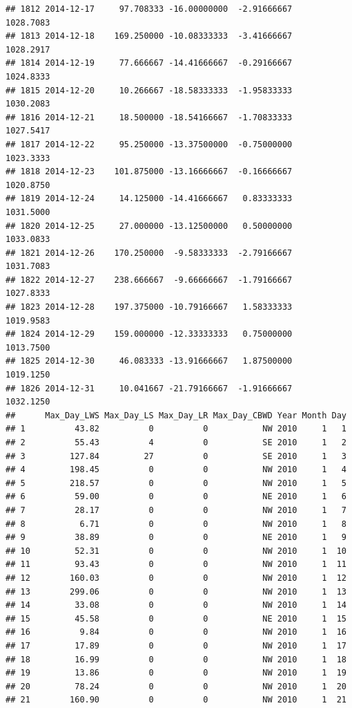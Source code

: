 \documentclass[
]{article}
\begin{document}
\begin{verbatim}
## 1812 2014-12-17     97.708333 -16.00000000  -2.91666667    1028.7083
## 1813 2014-12-18    169.250000 -10.08333333  -3.41666667    1028.2917
## 1814 2014-12-19     77.666667 -14.41666667  -0.29166667    1024.8333
## 1815 2014-12-20     10.266667 -18.58333333  -1.95833333    1030.2083
## 1816 2014-12-21     18.500000 -18.54166667  -1.70833333    1027.5417
## 1817 2014-12-22     95.250000 -13.37500000  -0.75000000    1023.3333
## 1818 2014-12-23    101.875000 -13.16666667  -0.16666667    1020.8750
## 1819 2014-12-24     14.125000 -14.41666667   0.83333333    1031.5000
## 1820 2014-12-25     27.000000 -13.12500000   0.50000000    1033.0833
## 1821 2014-12-26    170.250000  -9.58333333  -2.79166667    1031.7083
## 1822 2014-12-27    238.666667  -9.66666667  -1.79166667    1027.8333
## 1823 2014-12-28    197.375000 -10.79166667   1.58333333    1019.9583
## 1824 2014-12-29    159.000000 -12.33333333   0.75000000    1013.7500
## 1825 2014-12-30     46.083333 -13.91666667   1.87500000    1019.1250
## 1826 2014-12-31     10.041667 -21.79166667  -1.91666667    1032.1250
##      Max_Day_LWS Max_Day_LS Max_Day_LR Max_Day_CBWD Year Month Day
## 1          43.82          0          0           NW 2010     1   1
## 2          55.43          4          0           SE 2010     1   2
## 3         127.84         27          0           SE 2010     1   3
## 4         198.45          0          0           NW 2010     1   4
## 5         218.57          0          0           NW 2010     1   5
## 6          59.00          0          0           NE 2010     1   6
## 7          28.17          0          0           NW 2010     1   7
## 8           6.71          0          0           NW 2010     1   8
## 9          38.89          0          0           NE 2010     1   9
## 10         52.31          0          0           NW 2010     1  10
## 11         93.43          0          0           NW 2010     1  11
## 12        160.03          0          0           NW 2010     1  12
## 13        299.06          0          0           NW 2010     1  13
## 14         33.08          0          0           NW 2010     1  14
## 15         45.58          0          0           NE 2010     1  15
## 16          9.84          0          0           NW 2010     1  16
## 17         17.89          0          0           NW 2010     1  17
## 18         16.99          0          0           NW 2010     1  18
## 19         13.86          0          0           NW 2010     1  19
## 20         78.24          0          0           NW 2010     1  20
## 21        160.90          0          0           NW 2010     1  21

\end{verbatim}
\end{document}
